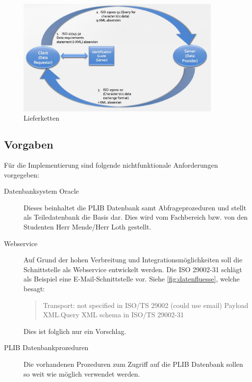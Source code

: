 \begin{figure}[htbp]
	\centering
		\includegraphics[width=0.90\textwidth]{images/lieferketten_plib.jpg}
		\caption[Lieferketten]{Lieferketten\footnotemark}
	\label{fig:lieferketten}
\end{figure}

\subsection{Vorgaben}

Für die Implementierung sind folgende nichtfunktionale Anforderungen vorgegeben:
\begin{description}
\item[Datenbanksystem Oracle] Dieses beinhaltet die PLIB Datenbank samt Abfrageprozeduren und stellt als Teiledatenbank die Basis dar. Dies wird vom Fachbereich bzw. von den Studenten Herr Mende/Herr Loth gestellt.
\item[Webservice] Auf Grund der hohen Verbreitung und Integrationsmöglichkeiten soll die Schnittstelle als \gls{Webservice} entwickelt werden. Die ISO 29002-31 schlägt als Beispiel eine E-Mail-Schnittstelle vor. Siehe \autoref{fig:datenfluesse}, welche besagt:
\begin{quotation}
Transport: not specified in ISO/TS 29002 (could use email) Payload XML.Query XML schema in ISO/TS 29002-31
\end{quotation}
Dies ist folglich nur ein Vorschlag. 
\item[PLIB Datenbankprozeduren] Die vorhandenen Prozeduren zum Zugriff auf die PLIB Datenbank sollen so weit wie möglich verwendet werden. 
\end{description}

